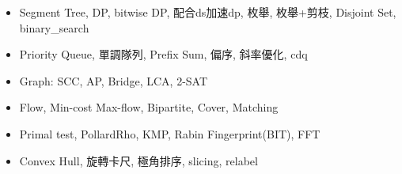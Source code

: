 \begin{itemize}
	\setlength\itemsep{-0.5em}
	\item Segment Tree, DP, bitwise DP, 配合ds加速dp, 枚舉, 枚舉+剪枝, Disjoint Set, binary_search
	\item Priority Queue, 單調隊列, Prefix Sum, 偏序, 斜率優化, cdq
	\item Graph: SCC, AP, Bridge, LCA, 2-SAT
	\item Flow, Min-cost Max-flow, Bipartite, Cover, Matching
	\item Primal test, PollardRho, KMP, Rabin Fingerprint(BIT), FFT
	\item Convex Hull, 旋轉卡尺, 極角排序, slicing, relabel
\end{itemize}
